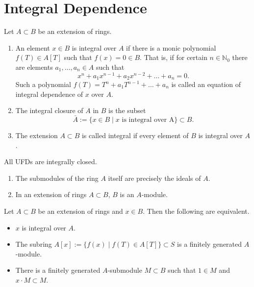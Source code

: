 \section{Integral Dependence}
\begin{definition}
    Let \(A \subset B\) be an extension of rings.
    \begin{enumerate}
        \item An element \(x \in B\) is integral over \(A\) if there is a monic polynomial \(f(T) \in A[T]\) such that \(f(x) = 0 \in B\). That is, if for certain \(n \in \mathbb{N}_0\) there are elements \(a_1, \dots, a_n \in A\) such that
        \begin{equation}
            x^n + a_1 x^{n-1} + a_2 x^{n-2} + \dots + a_n = 0.
        \end{equation}
        Such a polynomial \(f(T) = T^n + a_1 T^{n-1} + \dots + a_n\) is called an equation of integral dependence of \(x\) over \(A\).
        \item The integral closure of \(A\) in \(B\) is the subset
        \begin{equation}
            \bar{A} := \{x \in B \mid x \text{ is integral over A}\} \subset B.
        \end{equation}
        \item The extension \(A \subset B\) is called integral if every element of \(B\) is integral over \(A\).
    \end{enumerate}
\end{definition}
\begin{lemma}
    All UFDs are integrally closed.
\end{lemma}
\begin{definition}[\(A\)-Module]
    
\end{definition}
\begin{remark}
    \begin{enumerate}
        \item The submodules of the ring \(A\) itself are precisely the ideals of \(A\).
        \item In an extension of rings \(A \subset B\), \(B\) is an \(A\)-module.
    \end{enumerate}
\end{remark}
\begin{proposition}
    Let \(A \subset B\) be an extension of rings and \(x \in B\). Then the following are equivalent.
    \begin{itemize}
        \item \(x\) is integral over \(A\).
        \item The subring \(A[x] := \{f(x) \mid f(T) \in A[T]\} \subset S\) is a finitely generated \(A\)-module.
        \item There is a finitely generated \(A\)-submodule \(M \subset B\) such that \(1 \in M\) and \(x \cdot M \subset M\).
    \end{itemize}
\end{proposition}

